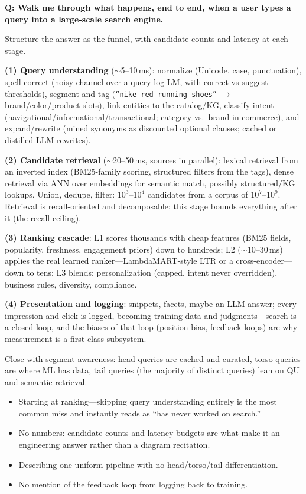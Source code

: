 \begin{interviewq}
\textbf{Q: Walk me through what happens, end to end, when a user types a query into a large-scale search engine.}

 \quad {} \quad \badgefreq{\freqhigh}

\stronganswer

Structure the answer as the funnel, with candidate counts and latency at each stage.

\textbf{(1) Query understanding} ($\sim$5--10\,ms): normalize (Unicode, case, punctuation), spell-correct (noisy channel over a query-log LM, with correct-vs-suggest thresholds), segment and tag (\texttt{``nike red running shoes''} $\to$ brand/color/product slots), link entities to the catalog/KG, classify intent (navigational/informational/transactional; category vs.\ brand in commerce), and expand/rewrite (mined synonyms as discounted optional clauses; cached or distilled LLM rewrites).

\textbf{(2) Candidate retrieval} ($\sim$20--50\,ms, sources in parallel): lexical retrieval from an inverted index (BM25-family scoring, structured filters from the tags), dense retrieval via ANN over embeddings for semantic match, possibly structured/KG lookups. Union, dedupe, filter: $10^3$--$10^4$ candidates from a corpus of $10^7$--$10^9$. Retrieval is recall-oriented and decomposable; this stage bounds everything after it (the recall ceiling).

\textbf{(3) Ranking cascade}: L1 scores thousands with cheap features (BM25 fields, popularity, freshness, engagement priors) down to hundreds; L2 ($\sim$10--30\,ms) applies the real learned ranker---LambdaMART-style LTR or a cross-encoder---down to tens; L3 blends: personalization (capped, intent never overridden), business rules, diversity, compliance.

\textbf{(4) Presentation and logging}: snippets, facets, maybe an LLM answer; every impression and click is logged, becoming training data and judgments---search is a closed loop, and the biases of that loop (position bias, feedback loops) are why measurement is a first-class subsystem.

Close with segment awareness: head queries are cached and curated, torso queries are where ML has data, tail queries (the majority of distinct queries) lean on QU and semantic retrieval.

\redflags
\begin{itemize}
    \item Starting at ranking---skipping query understanding entirely is the most common miss and instantly reads as ``has never worked on search.''
    \item No numbers: candidate counts and latency budgets are what make it an engineering answer rather than a diagram recitation.
    \item Describing one uniform pipeline with no head/torso/tail differentiation.
    \item No mention of the feedback loop from logging back to training.
\end{itemize}


\end{interviewq}
